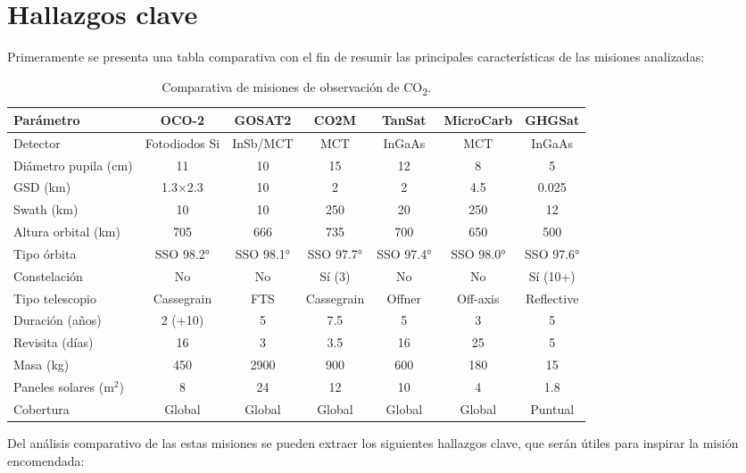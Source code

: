 \section{Hallazgos clave}
Primeramente se presenta una tabla comparativa con el fin de resumir las principales características de las misiones analizadas:



\begin{landscape}
\begin{table}[p]
\centering
\caption{Comparativa de misiones de observación de CO\textsubscript{2}.}
\small
\begin{tabular}{lcccccc}
\toprule
\textbf{Parámetro} & \textbf{OCO-2} & \textbf{GOSAT2} & \textbf{CO2M} & \textbf{TanSat} & \textbf{MicroCarb} & \textbf{GHGSat} \\
\midrule
Detector & Fotodiodos Si  & InSb/MCT & MCT & InGaAs & MCT & InGaAs \\
Diámetro pupila (cm) & 11 & 10 & 15 & 12 & 8 & 5 \\
GSD (km) & 1.3$\times$2.3 & 10 & 2 & 2 & 4.5 & 0.025 \\
Swath (km) & 10 & 10 & 250 & 20 & 250 & 12 \\
Altura orbital (km) & 705 & 666 & 735 & 700 & 650 & 500 \\
Tipo órbita & SSO 98.2° & SSO 98.1° & SSO 97.7° & SSO 97.4° & SSO 98.0° & SSO 97.6° \\
Constelación & No & No & Sí (3) & No & No & Sí (10+) \\
Tipo telescopio & Cassegrain & FTS & Cassegrain & Offner & Off-axis & Reflective \\
Duración (años) & 2 (+10) & 5 & 7.5 & 5 & 3 & 5 \\
Revisita (días) & 16 & 3 & 3.5 & 16 & 25 & 5 \\
Masa (kg) & 450 & 2900 & 900 & 600 & 180 & 15 \\
Paneles solares (m$^2$) & 8 & 24 & 12 & 10 & 4 & 1.8 \\
Cobertura & Global & Global & Global & Global & Global & Puntual \\
\bottomrule
\end{tabular}

\end{table}
\end{landscape}

Del análisis comparativo de las estas misiones se pueden extraer los siguientes hallazgos clave, que serán útiles para inspirar la misión encomendada:

